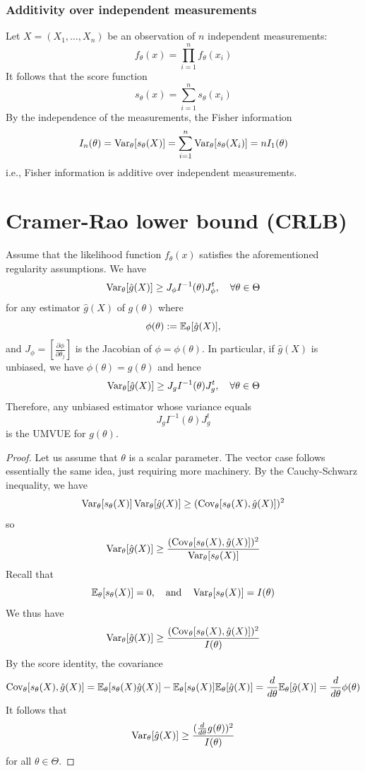 \documentclass[11pt]{book}
\begin{document}
 \subsubsection{Additivity over independent measurements}
 Let $X = (X_1, \dots, X_n)$ be an observation of $n$ independent measurements: 
 \[
   f_\theta(x) = \prod_{i=1}^n f_\theta(x_i)
 \]
 It follows that the score function
 \[
   s_\theta(x) = \sum_{i=1}^{n} s_\theta (x_i)
 \]
 By the independence of the measurements, the Fisher information 
 \[ 
   I_n(\theta) = \operatorname{Var}_\theta[s_\theta(X)] = \sum_{i=1}^n \operatorname{Var}_\theta[s_\theta(X_i)] = n I_1(\theta)
 \] 
 i.e., Fisher information is additive over independent measurements.
 \section{Cramer-Rao lower bound (CRLB)}
 Assume that the likelihood function $f_\theta(x)$ satisfies the aforementioned regularity assumptions. We have 
 \[ 
   \operatorname{Var}_\theta[\hat{g}(X)] \geq J_\phi I^{-1} (\theta) J_\phi^t, \quad \forall \theta \in \Theta
 \]
 for any estimator $\hat{g}(X)$ of $g(\theta)$ where 
 \[
   \phi(\theta) := \mathbb{E}_\theta[\hat{g}(X)],
 \]
 and $J_\phi = \left[ \frac{\partial\phi}{\partial \theta_j}\right]$ is the Jacobian of $\phi = \phi(\theta)$. In particular, if $\hat{g}(X)$ is unbiased, we have 
 $\phi(\theta) = g(\theta)$ and hence 
 \[
   \operatorname{Var}_\theta[\hat{g}(X)] \geq J_g I^{-1}(\theta) J_g^t, \quad \forall \theta \in \Theta 
 \]
 Therefore, any unbiased estimator whose variance equals 
 \[ 
   J_g I^{-1} (\theta) J_g^t 
 \]
 is the UMVUE for $g(\theta)$.

 \begin{proof}
   Let us assume that $\theta$ is a scalar parameter. The vector case follows essentially the same idea, just requiring more machinery. By the Cauchy-Schwarz inequality, we have 
   \[
     \operatorname{Var}_\theta [s_\theta(X)] \operatorname{Var}_\theta[\hat{g}(X)] \geq (\mathrm{Cov}_\theta[s_\theta(X), \hat{g}(X)])^2
    \]
    so 
    \[
      \operatorname{Var}_\theta[\hat{g}(X)] \geq \frac{(\mathrm{Cov}_\theta[s_\theta(X), \hat{g}(X)])^2}{\operatorname{Var}_\theta[s_\theta(X)]}
    \]
    Recall that 
    \[
      \mathbb{E}_\theta[s_\theta(X)] = 0, \quad \text{and} \quad \operatorname{Var}_\theta[s_\theta(X)] = I(\theta)
    \]
    We thus have 
    \[
      \operatorname{Var}_\theta[\hat{g}(X)] \geq \frac{(\mathrm{Cov}_\theta[s_\theta(X), \hat{g}(X)])^2}{I(\theta)}
    \]
    By the score identity, the covariance 
    \[
      \mathrm{Cov}_\theta[s_\theta(X), \hat{g}(X)] = \mathbb{E}_\theta[s_\theta(X)\hat{g}(X)] - \mathbb{E}_\theta[s_\theta(X)] \mathbb{E}_\theta[\hat{g}(X)] = \frac{d}{d\theta} \mathbb{E}_\theta[\hat{g}(X)] = \frac{d}{d\theta} \phi(\theta)
    \]
    It follows that 
    \[
      \operatorname{Var}_\theta[\hat{g}(X)] \geq \frac{(\frac{d}{d\theta}g(\theta))^2}{I(\theta)}
    \] for all $\theta \in \Theta$.
  \end{proof}
\end{document}

